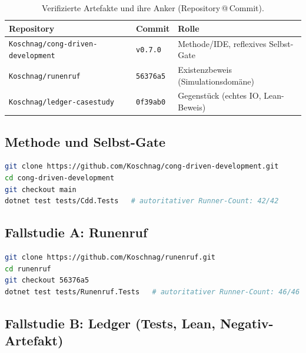 \documentclass[11pt,a4paper]{article}
\theoremstyle{definition}
\theoremstyle{remark}
\begin{document}
\begin{table}[htbp]
  \centering
  \small
  \caption{Verifizierte Artefakte und ihre Anker (Repository\,@\,Commit).}
  \label{tab:repos}
  \begin{tabular}{@{}lll@{}}
    \toprule
    \textbf{Repository} & \textbf{Commit} & \textbf{Rolle} \\
    \midrule
    \texttt{Koschnag/cong-driven-development} & \texttt{v0.7.0} & Methode/IDE, reflexives Selbst-Gate \\
    \texttt{Koschnag/runenruf} & \texttt{56376a5} & Existenzbeweis (Simulationsdomäne) \\
    \texttt{Koschnag/ledger-casestudy} & \texttt{0f39ab0} & Gegenstück (echtes IO, Lean-Beweis) \\
    \bottomrule
  \end{tabular}
\end{table}

\subsection{Methode und Selbst-Gate}
\label{app:repro-cdd}

\begin{lstlisting}[language=bash,caption={CDD-Selbst-Gate: $42/42$ Tests, $62/66$ \texttt{Aligned}.},label={lst:repro-cdd}]
git clone https://github.com/Koschnag/cong-driven-development.git
cd cong-driven-development
git checkout main
dotnet test tests/Cdd.Tests   # autoritativer Runner-Count: 42/42
\end{lstlisting}

\subsection{Fallstudie A: Runenruf}
\label{app:repro-runenruf}

\begin{lstlisting}[language=bash,caption={Runenruf: $46/46$ Tests, FsCheck \texttt{spec-siegel-lager-nichtnegativ}.},label={lst:repro-runenruf}]
git clone https://github.com/Koschnag/runenruf.git
cd runenruf
git checkout 56376a5
dotnet test tests/Runenruf.Tests   # autoritativer Runner-Count: 46/46
\end{lstlisting}

\subsection{Fallstudie B: Ledger (Tests, Lean, Negativ-Artefakt)}
\label{app:repro-ledger}
\end{document}

